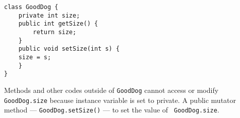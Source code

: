 \documentclass{tufte-handout}
\begin{document}
    \begin{lstlisting}
class GoodDog {
    private int size;
    public int getSize() {
        return size;
    }
    public void setSize(int s) {
    size = s;
    }
}       
    \end{lstlisting}

    Methods and other codes outside of \texttt{GoodDog} cannot access or modify \texttt{GoodDog.size} because instance variable is set to private. A public mutator method --- \texttt{GoodDog.setSize()} --- to set the value of \texttt{  GoodDog.size}.
\end{document}
